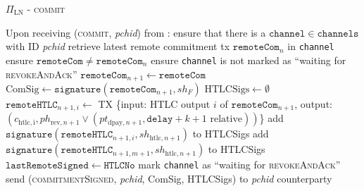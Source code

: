 \begin{protocolbox}{$\Pi_{\mathrm{LN}}$ - \textsc{commit}}
  \label{alg:protocol:pay:commit}
  \begin{algorithmic}[1]
    \State Upon receiving (\textsc{commit}, \textit{pchid}) from \environment:
    \Indent
      \State ensure that there is a $\mathtt{channel} \in \mathtt{channels}$
      with ID \textit{pchid}
      \State retrieve latest remote commitment tx $\mathtt{remoteCom}_n$ in
      \texttt{channel}
      \State ensure $\mathtt{remoteCom} \neq \mathtt{remoteCom}_n$
      \State ensure \texttt{channel} is not marked as ``waiting for
      \textsc{revokeAndAck}''
      \State $\mathtt{remoteCom}_{n+1} \gets \mathtt{remoteCom}$
      \State $\mathrm{ComSig} \gets
      \mathtt{signature}\left(\mathtt{remoteCom}_{n+1}, sh_F\right)$
      \State $\mathrm{HTLCSigs} \gets \emptyset$
        \State $\mathtt{remoteHTLC}_{n+1, i} \gets$ TX \{input: HTLC output $i$
        of $\mathtt{remoteCom}_{n+1}$, output: $\left(c_{\mathrm{htlc, i}},
        ph_{\mathrm{rev}, n+1} \vee \left(pt_{\mathrm{dpay}, n+1},
        \mathtt{delay} + k + 1 \text{ relative}\right)\right)$\}
        \State add $\mathtt{signature}\left(\mathtt{remoteHTLC}_{n+1, i},
        sh_{\mathrm{htlc}, n+1}\right)$ to HTLCSigs
      \EndFor
      \State add $\mathtt{signature}\left(\mathtt{remoteHTLC}_{n+1, m+1},
      sh_{\mathrm{htlc}, n+1}\right)$ to HTLCSigs
      \State $\mathtt{lastRemoteSigned} \gets \mathtt{HTLCNo}$
      \State mark \texttt{channel} as ``waiting for \textsc{revokeAndAck}''
      \State send (\textsc{commitmentSigned}, \textit{pchid}, ComSig, HTLCSigs)
      to \textit{pchid} counterparty
    \EndIndent
  \end{algorithmic}
\end{protocolbox}

